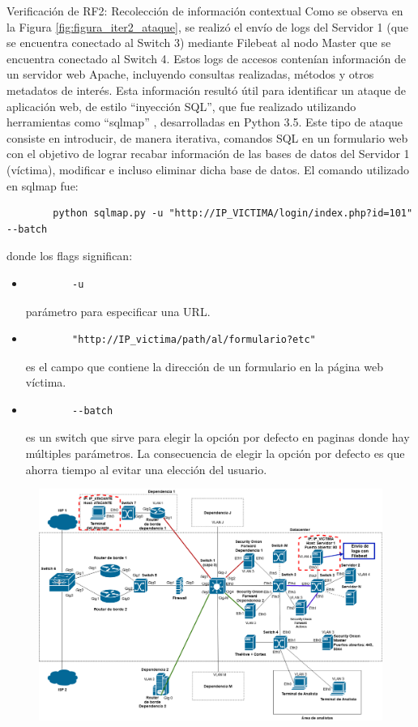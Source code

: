\begin{section}{Verificación de RF2: Recolección de información contextual}
    Como se observa en la Figura \ref{fig:figura_iter2_ataque}, se realizó el envío de logs del Servidor 1 (que se encuentra conectado al Switch 3) mediante Filebeat al nodo Master que se encuentra conectado al Switch 4. Estos logs de accesos contenían información de un servidor web Apache, incluyendo consultas realizadas, métodos y otros metadatos de interés. Esta información resultó útil para identificar un ataque de aplicación web, de estilo “inyección SQL”, que fue realizado utilizando herramientas como “sqlmap” \cite{sqlmap}, desarrolladas en Python 3.5. Este tipo de ataque consiste en introducir, de manera iterativa, comandos SQL en un formulario web con el objetivo de lograr recabar información de las bases de datos del Servidor 1 (víctima), modificar e incluso eliminar dicha base de datos. El comando utilizado en sqlmap fue:
    \begin{verbatim}
        python sqlmap.py -u "http://IP_VICTIMA/login/index.php?id=101" --batch
    \end{verbatim} 
    donde los flags significan:
    \begin{itemize}
    \item \begin{verbatim}
        -u
    \end{verbatim}
     parámetro para especificar una URL.
    \item \begin{verbatim}
        "http://IP_victima/path/al/formulario?etc"
    \end{verbatim} 
    es el campo que contiene la dirección de un formulario en la página web víctima.
    \item \begin{verbatim}
        --batch
    \end{verbatim}
     es un switch que sirve para elegir la opción por defecto en paginas donde hay múltiples parámetros. La consecuencia de elegir la opción por defecto es que ahorra tiempo al evitar una elección del usuario.
    \end{itemize}
    \begin{figure}[H]
    \centering
    \includegraphics[width=1\textwidth]{./iteracion_2_imagenes/Topologia de despliegue descentralizada RF2, RF6 y RF4-FILEBEAT.png}

\end{figure}
\end{section}
